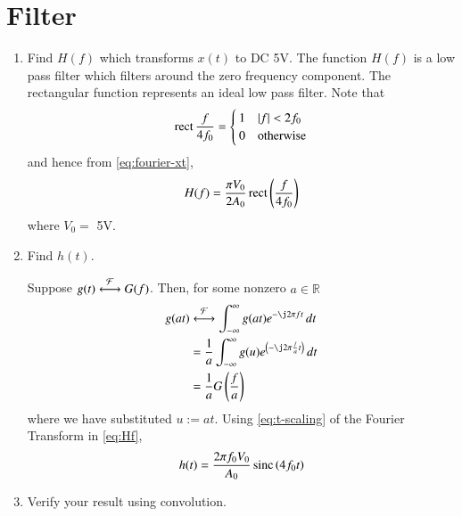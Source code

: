 \documentclass[journal,12pt,twocolumn]{IEEEtran}
\renewcommand\thesection{\arabic{section}}
\begin{document}
\section{Filter}
\begin{enumerate}[label=\thesection.\arabic*
,ref=\thesection.\theenumi]
\item Find $H(f)$ which transforms $x(t)$ to DC 5V.
The function $H(f)$ is a low pass filter which filters around the
zero frequency component. The rectangular function represents an ideal
low pass filter. Note that
\begin{align}
    \mathop{\mathrm{rect}}{\frac{f}{4f_0}} = 
    \begin{cases}
        1 & \left\vert f\right\vert < 2f_0 \\
        0 & \textrm{otherwise}
    \end{cases}
\end{align}
and hence from \eqref{eq:fourier-xt},
\begin{align}
    H(f) = \frac{\pi V_0}{2A_0}\mathop{\mathrm{rect}}\left(\frac{f}{4f_0}\right)
    \label{eq:Hf}
\end{align}
where $V_0 =$ 5V.

\item Find $h(t)$.

\solution Suppose $g(t)\overset{\mathcal{F}}{ \longleftrightarrow}G(f)$. Then, for some
nonzero $a \in \mathbb{R}$
\begin{align}
    g(at)&\system{F}\int_{-\infty}^{\infty}g(at)e^{-\j2\pi ft}\, dt \\
         &=\frac{1}{a}\int_{-\infty}^{\infty}g(u)e^{\brak{-\j2\pi \frac{f}{a}t}}\, dt \\
         &=\frac{1}{a}G\brak{\frac{f}{a}}
         \label{eq:t-scaling}
\end{align}
where we have substituted $u := at$. Using 
\eqref{eq:t-scaling} of the Fourier Transform in \eqref{eq:Hf},
\begin{align}
    h(t) = \frac{2\pi f_0V_0}{A_0}\mathop{\mathrm{sinc}}\left(4f_0t\right)
\end{align}
\item Verify your result using convolution.


\end{enumerate}
\end{document}
